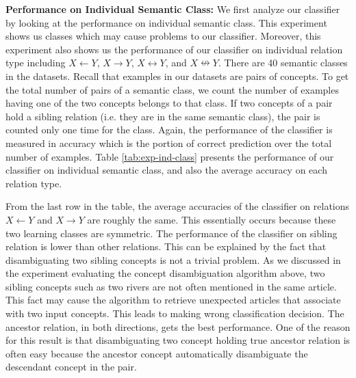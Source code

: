 {\bf Performance on Individual Semantic Class:} We first analyze our
classifier by looking at the performance on individual semantic
class. This experiment shows us classes which may cause problems to
our classifier. Moreover, this experiment also shows us the
performance of our classifier on individual relation type including $X
\leftarrow Y$, $X \rightarrow Y$, $X \leftrightarrow Y$, and $X
\nleftrightarrow Y$. There are 40 semantic classes in the
datasets. Recall that examples in our datasets are pairs of
concepts. To get the total number of pairs of a semantic class, we
count the number of examples having one of the two concepts belongs to
that class. If two concepts of a pair hold a sibling relation
(i.e. they are in the same semantic class), the pair is counted only
one time for the class. Again, the performance of the classifier is
measured in accuracy which is the portion of correct prediction over
the total number of examples. Table \ref{tab:exp-ind-class} presents
the performance of our classifier on individual semantic class, and
also the average accuracy on each relation type.

From the last row in the table, the average accuracies of the
classifier on relations $X \leftarrow Y$ and $X \rightarrow Y$ are
roughly the same. This essentially occurs because these two learning
classes are symmetric. The performance of the classifier on sibling
relation is lower than other relations. This can be explained by the
fact that disambiguating two sibling concepts is not a trivial
problem. As we discussed in the experiment evaluating the concept
disambiguation algorithm above, two sibling concepts such as two
rivers are not often mentioned in the same article. This fact may
cause the algorithm to retrieve unexpected articles that associate
with two input concepts. This leads to making wrong classification
decision. The ancestor relation, in both directions, gets the best
performance. One of the reason for this result is that disambiguating
two concept holding true ancestor relation is often easy because the
ancestor concept automatically disambiguate the descendant concept in
the pair.

